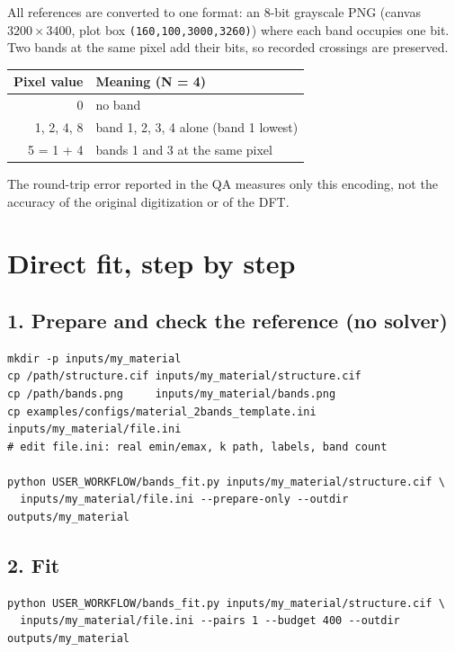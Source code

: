 \documentclass[11pt,a4paper]{article}
\newcommand{\cmd}[1]{\texttt{#1}}
\renewcommand{\_}{\origunderscore\allowbreak}
\begin{document}
All references are converted to one format: an 8-bit grayscale PNG (canvas $3200\times3400$, plot box
\cmd{(160,100,3000,3260)}) where each band occupies one bit. Two bands at the same pixel add their bits,
so recorded crossings are preserved.

\begin{center}
\begin{tabular}{rl}
\toprule
Pixel value & Meaning (N = 4) \\
\midrule
0 & no band \\
1, 2, 4, 8 & band 1, 2, 3, 4 alone (band 1 lowest) \\
5 = 1 + 4 & bands 1 and 3 at the same pixel \\
\bottomrule
\end{tabular}
\end{center}

The round-trip error reported in the QA measures only this encoding, not the accuracy of the original
digitization or of the DFT.

\section{Direct fit, step by step}\label{sec:direct}

\subsection{1. Prepare and check the reference (no solver)}

\begin{lstlisting}[style=sh]
mkdir -p inputs/my_material
cp /path/structure.cif inputs/my_material/structure.cif
cp /path/bands.png     inputs/my_material/bands.png
cp examples/configs/material_2bands_template.ini inputs/my_material/file.ini
# edit file.ini: real emin/emax, k path, labels, band count

python USER_WORKFLOW/bands_fit.py inputs/my_material/structure.cif \
  inputs/my_material/file.ini --prepare-only --outdir outputs/my_material
\end{lstlisting}

\subsection{2. Fit}

\begin{lstlisting}[style=sh]
python USER_WORKFLOW/bands_fit.py inputs/my_material/structure.cif \
  inputs/my_material/file.ini --pairs 1 --budget 400 --outdir outputs/my_material
\end{lstlisting}
\end{document}
